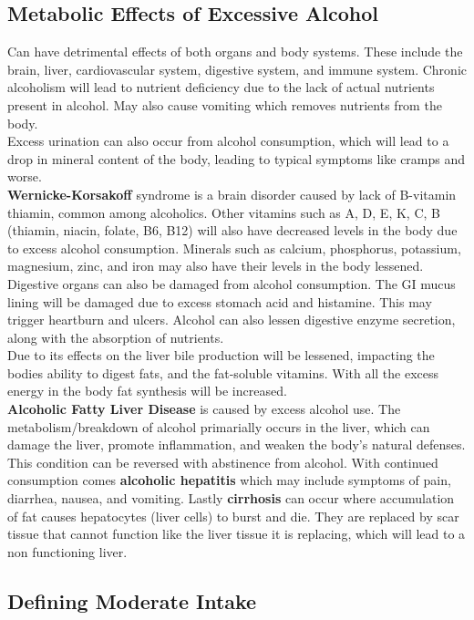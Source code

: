 \documentclass[letterpaper, 11pt]{article}
\begin{document}
\subsection{Metabolic Effects of Excessive Alcohol}
\label{sec:org1044bfe}
Can have detrimental effects of both organs and body systems. These include the brain, liver, cardiovascular system, digestive system, and immune system. Chronic alcoholism will lead to nutrient deficiency due to the lack of actual nutrients present in alcohol. May also cause vomiting which removes nutrients from the body.\\
Excess urination can also occur from alcohol consumption, which will lead to a drop in mineral content of the body, leading to typical symptoms like cramps and worse.\\
\textbf{Wernicke-Korsakoff} syndrome is a brain disorder caused by lack of B-vitamin thiamin, common among alcoholics. Other vitamins such as A, D, E, K, C, B (thiamin, niacin, folate, B6, B12) will also have decreased levels in the body due to excess alcohol consumption. Minerals such as calcium, phosphorus, potassium, magnesium, zinc, and iron may also have their levels in the body lessened.\\
Digestive organs can also be damaged from alcohol consumption. The GI mucus lining will be damaged due to excess stomach acid and histamine. This may trigger heartburn and ulcers. Alcohol can also lessen digestive enzyme secretion, along with the absorption of nutrients.\\
Due to its effects on the liver bile production will be lessened, impacting the bodies ability to digest fats, and the fat-soluble vitamins. With all the excess energy in the body fat synthesis will be increased.\\
\textbf{Alcoholic Fatty Liver Disease} is caused by excess alcohol use. The metabolism/breakdown of alcohol primarially occurs in the liver, which can damage the liver, promote inflammation, and weaken the body's natural defenses. This condition can be reversed with abstinence from alcohol. With continued consumption comes \textbf{alcoholic hepatitis} which may include symptoms of pain, diarrhea, nausea, and vomiting. Lastly \textbf{cirrhosis} can occur where accumulation of fat causes hepatocytes (liver cells) to burst and die. They are replaced by scar tissue that cannot function like the liver tissue it is replacing, which will lead to a non functioning liver.\\
\subsection{Defining Moderate Intake}
\label{sec:org493f9ea}
\end{document}
